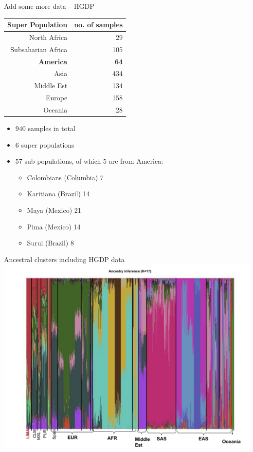 \documentclass[11pt,xcolor=table]{beamer}
\begin{document}
\begin{frame}{Add some more data -- HGDP}
\begin{table}[]
\centering
\begin{tabular}{|r|r|}
\hline
Super Population & no. of samples \\
\hline
North Africa  & 29 \\
Subsaharian Africa & 105 \\
{\bf{America}} & \bf 64  \\
Asia    &434 \\
Middle Est     &134 \\
Europe  &158 \\
Oceania &28 \\
\hline
\end{tabular}
\end{table}
\begin{itemize}
\item 940 samples in total
\item 6 super populations
\item 57 sub populations, of which 5 are from America:
\begin{itemize}
\item Colombians (Columbia)      7
\item Karitiana (Brazil)      14
\item Maya (Mexico)  21
\item Pima (Mexico)   14
\item Surui (Brazil)   8
\end{itemize}
\end{itemize}
\end{frame}
\begin{frame}{Ancestral clusters including HGDP data}
\centering
\includegraphics[width=1.05\textwidth]{pics/admixture_plot.pdf}
\end{frame}
\end{document}
